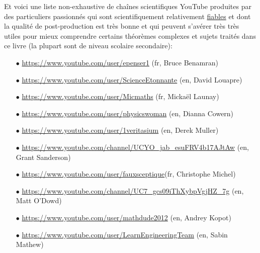 	\pagebreak
	Et voici une liste non-exhaustive de chaînes scientifiques YouTube produites par des particuliers passionnés qui sont scientifiquement relativement \underline{fiables} et dont la qualité de post-production est très bonne et qui peuvent s'avérer très très utiles pour mieux comprendre certains théorèmes complexes et sujets traités dans ce livre (la plupart sont de niveau scolaire secondaire):
	\begin{itemize}
		 \item[$\bullet$] \href{https://www.youtube.com/user/epenser1}{\color{blue}https://www.youtube.com/user/epenser1} (fr, Bruce Benamran)
		 
		 \item[$\bullet$] \href{https://www.youtube.com/user/ScienceEtonnante}{\color{blue}https://www.youtube.com/user/ScienceEtonnante} (en, David Louapre)
		 
		 \item[$\bullet$] \href{https://www.youtube.com/user/Micmaths}{\color{blue}https://www.youtube.com/user/Micmaths} (fr, Mickaël Launay)
		 
		 \item[$\bullet$]  \href{https://www.youtube.com/user/physicswoman}{\color{blue}https://www.youtube.com/user/physicswoman} (en, Dianna Cowern)
		 
		 \item[$\bullet$] \href{https://www.youtube.com/user/1veritasium}{\color{blue}https://www.youtube.com/user/1veritasium} (en, Derek Muller)
		 
		 \item[$\bullet$] \href{https://www.youtube.com/channel/UCYO_jab_esuFRV4b17AJtAw}{\color{blue}https://www.youtube.com/channel/UCYO\_jab\_esuFRV4b17AJtAw} (en, Grant Sanderson)
		 
		 \item[$\bullet$] \href{https://www.youtube.com/user/fauxsceptique}{\color{blue}https://www.youtube.com/user/fauxsceptique}(fr, Christophe Michel)
		 
		 \item[$\bullet$] \href{https://www.youtube.com/channel/UC7_gcs09iThXybpVgjHZ_7g}{\color{blue}https://www.youtube.com/channel/UC7\_gcs09iThXybpVgjHZ\_7g} (en, Matt O'Dowd)
		 
		 \item[$\bullet$] \href{https://www.youtube.com/user/mathdude2012}{\color{blue}https://www.youtube.com/user/mathdude2012} (en, Andrey Kopot)
		 
		 \item[$\bullet$] \href{https://www.youtube.com/user/LearnEngineeringTeam}{\color{blue}https://www.youtube.com/user/LearnEngineeringTeam} (en, Sabin Mathew)
	\end{itemize}

